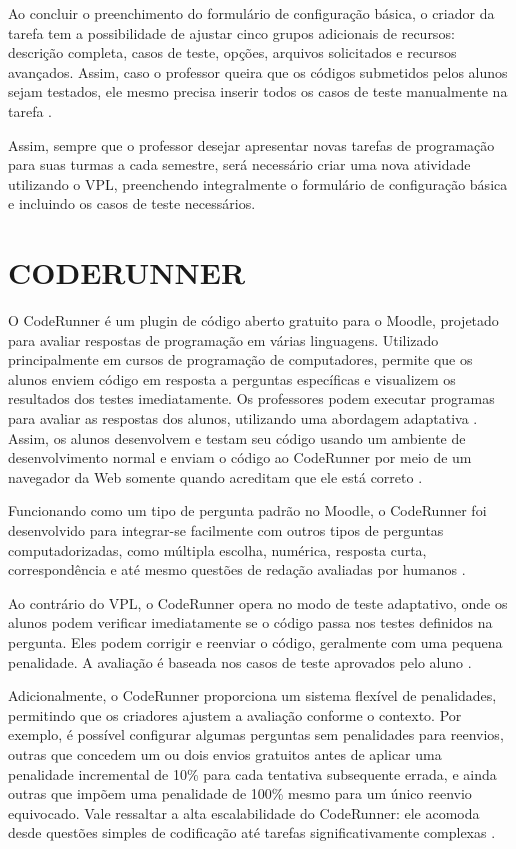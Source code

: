 Ao concluir o preenchimento do formulário de configuração básica, o criador da tarefa tem a possibilidade de ajustar cinco grupos adicionais de recursos: descrição completa, casos de teste, opções, arquivos solicitados e recursos avançados. Assim, caso o professor queira que os códigos submetidos pelos alunos sejam testados, ele mesmo precisa inserir todos os casos de teste manualmente na tarefa \cite{vpl}.

Assim, sempre que o professor desejar apresentar novas tarefas de programação para suas turmas a cada semestre, será necessário criar uma nova atividade utilizando o VPL, preenchendo integralmente o formulário de configuração básica e incluindo os casos de teste necessários.

\section{CODERUNNER}

O CodeRunner é um plugin de código aberto gratuito para o Moodle, projetado para avaliar respostas de programação em várias linguagens. Utilizado principalmente em cursos de programação de computadores, permite que os alunos enviem código em resposta a perguntas específicas e visualizem os resultados dos testes imediatamente. Os professores podem executar programas para avaliar as respostas dos alunos, utilizando uma abordagem adaptativa \cite{coderunner}. Assim, os alunos desenvolvem e testam seu código usando um ambiente de desenvolvimento normal e enviam o código ao CodeRunner por meio de um navegador da Web somente quando acreditam que ele está correto \cite[p.~47]{lobbharlow}.

Funcionando como um tipo de pergunta padrão no Moodle, o CodeRunner foi desenvolvido para integrar-se facilmente com outros tipos de perguntas computadorizadas, como múltipla escolha, numérica, resposta curta, correspondência e até mesmo questões de redação avaliadas por humanos \cite[p.~48]{lobbharlow}. 

Ao contrário do VPL, o CodeRunner opera no modo de teste adaptativo, onde os alunos podem verificar imediatamente se o código passa nos testes definidos na pergunta. Eles podem corrigir e reenviar o código, geralmente com uma pequena penalidade. A avaliação é baseada nos casos de teste aprovados pelo aluno \cite{moodle}.

 Adicionalmente, o CodeRunner proporciona um sistema flexível de penalidades, permitindo que os criadores ajustem a avaliação conforme o contexto. Por exemplo, é possível configurar algumas perguntas sem penalidades para reenvios, outras que concedem um ou dois envios gratuitos antes de aplicar uma penalidade incremental de 10\% para cada tentativa subsequente errada, e ainda outras que impõem uma penalidade de 100\% mesmo para um único reenvio equivocado. Vale ressaltar a alta escalabilidade do CodeRunner: ele acomoda desde questões simples de codificação até tarefas significativamente complexas \cite[p.~48]{lobbharlow}.
 
